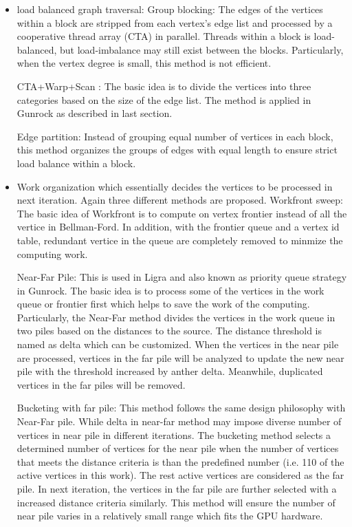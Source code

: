 \begin{itemize}
    \item load balanced graph traversal:
        \subitem Group blocking: The edges of the vertices within a block are
        stripped from each vertex's edge list and processed by a cooperative
        thread array (CTA) in parallel. Threads within a block is load-balanced,
        but load-imbalance may still exist between the blocks. Particularly,
        when the vertex degree is small, this method is not efficient.

        \subitem CTA+Warp+Scan \cite{merrill2012scalable}: The basic idea is to divide the vertices into
        three categories based on the size of the edge list. The method is
        applied in Gunrock as described in last section. 

        \subitem Edge partition: Instead of grouping equal number of vertices in
        each block, this method organizes the groups of edges with equal length
        to ensure strict load balance within a block. 
    \item Work organization which essentially decides the vertices to be
        processed in next iteration. Again three different methods are proposed.
        \subitem Workfront sweep: The basic idea of Workfront is to compute on
        vertex frontier instead of all the vertice in Bellman-Ford. In addition,
        with the frontier queue and a vertex id table, redundant vertice in the
        queue are completely removed to minmize the computing work.

        \subitem Near-Far Pile: This is used in Ligra and also known as priority
        queue strategy in Gunrock. The basic idea is to process some of the
        vertices in the work queue or frontier first which helps to save the
        work of the computing. Particularly, the Near-Far method divides the
        vertices in the work queue in two piles based on the distances to the
        source. The distance threshold is named as delta which can be
        customized. When the vertices in the near pile are processed, vertices
        in the far pile will be analyzed to update the new near pile with the
        threshold increased by anther delta. Meanwhile, duplicated vertices in
        the far piles will be removed. 

        \subitem Bucketing with far pile: This method follows the same design
        philosophy with Near-Far pile. While delta in near-far method may impose
        diverse number of vertices in near pile in different iterations. The
        bucketing method selects a determined number of vertices for the near
        pile when the number of vertices that meets the distance criteria is
        than the predefined number (i.e. 1\/10 of the active vertices in this
        work). The rest active vertices are considered as the far pile. In next
        iteration, the vertices in the far pile are further selected with a
        increased distance criteria similarly. This method will ensure the
        number of near pile varies in a relatively small range which fits 
        the GPU hardware. 
\end{itemize}
